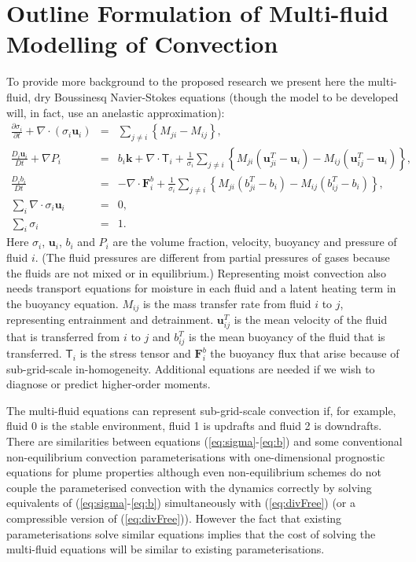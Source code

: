 \documentclass[11pt,a4paper]{article}
\begin{document}
\section{Outline Formulation of Multi-fluid Modelling of Convection}
\label{sec:mf}

To provide more background to the proposed research we present here the
multi-fluid, dry Boussinesq Navier-Stokes equations \cite[approximated by][]{WMS20} (though the model to be developed will, in fact,
use an anelastic approximation):
\begin{eqnarray}
\frac{\partial\sigma_{i}}{\partial t}+\nabla\cdot(\sigma_{i}\mathbf{u}_{i}) & = & {\textstyle\sum}_{j\ne i}\left\{ M_{ji}-M{}_{ij}\right\} ,\label{eq:sigma}\\
\frac{D_{i}\mathbf{u}_{i}}{Dt}+\nabla P_{i} & = & b_{i}\mathbf{k}+\nabla\cdot \mathsf{T}_i +\frac{1}{\sigma_{i}}{\textstyle\sum}_{j\ne i}\left\{ M_{ji}\left(\mathbf{u}_{ji}^{T}-\mathbf{u}_{i}\right)-M_{ij}\left(\mathbf{u}_{ij}^{T}-\mathbf{u}_{i}\right)\right\} , \label{eq:mom}\\
\frac{D_{i}b_{i}}{Dt} & = & -\nabla\cdot \mathbf{F}^b_{i} +\frac{1}{\sigma_{i}}{\textstyle\sum}_{j\ne i}\left\{ M_{ji}\left(b_{ji}^{T}-b_{i}\right)-M_{ij}\left(b_{ij}^{T}-b_{i}\right)\right\} , \label{eq:b}\\
{\textstyle\sum}_{i}\nabla\cdot\sigma_{i}\mathbf{u}_{i} & = & 0 , \label{eq:divFree}\\
{\textstyle\sum}_{i}\sigma_{i} & = & 1.\label{eq:sumOne}
\end{eqnarray}
Here $\sigma_i$, $\mathbf{u}_i$, $b_i$ and $P_i$ are the volume fraction, velocity, buoyancy and pressure of fluid $i$. (The fluid pressures are different from partial pressures of gases because the fluids are not mixed or in equilibrium.) Representing moist convection also needs transport equations for moisture in each fluid and a latent heating term in the buoyancy equation. $M_{ij}$ is the mass transfer rate from fluid $i$ to $j$, representing entrainment and detrainment. $\mathbf{u}_{ij}^T$ is the mean velocity of the fluid that is transferred from $i$ to $j$ and $b_{ij}^T$ is the mean buoyancy of the fluid that is transferred. 
$\mathsf{T}_i$ is the stress tensor and $\mathbf{F}^b_{i}$ the buoyancy flux that arise because of sub-grid-scale in-homogeneity.
Additional equations are needed if we wish to diagnose or predict higher-order moments.

The multi-fluid equations can represent sub-grid-scale convection if, for example, fluid 0 is the stable environment, fluid 1 is updrafts and fluid 2 is downdrafts. There are similarities between equations (\ref{eq:sigma}-\ref{eq:b}) and some conventional non-equilibrium convection parameterisations with one-dimensional prognostic equations for plume properties \cite[e.g.][]{GG05} although even non-equilibrium schemes do not couple the parameterised convection with the dynamics correctly by solving equivalents of (\ref{eq:sigma}-\ref{eq:b})  simultaneously with (\ref{eq:divFree}) (or a compressible version of (\ref{eq:divFree})). However the fact that existing parameterisations solve similar equations implies that the cost of solving the multi-fluid equations will be similar to existing parameterisations.
\end{document}
